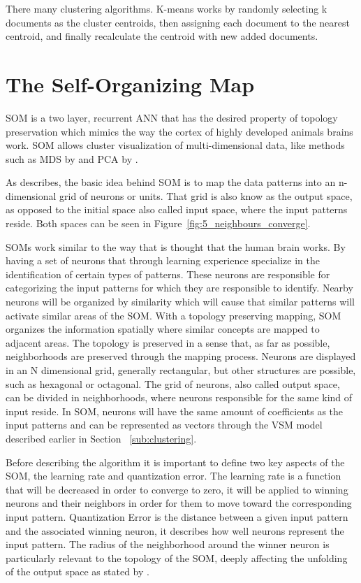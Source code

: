 There many clustering algorithms. K-means works by randomly selecting k documents as the cluster centroids, then assigning each document to the nearest centroid, and finally recalculate the centroid with new added documents. 

\section{The Self-Organizing Map} 
\label{sec:the_self_organizing_map}

\ac{SOM} is a two layer, recurrent \ac{ANN} that has the desired property of topology preservation which mimics the way the cortex of highly developed animals brains work. \ac{SOM} allows cluster visualization of multi-dimensional data, like methods such as \ac{MDS} by \citet{KruskalWish1978} and \ac{PCA} by \citet[]{Hotelling_1933} .  

As \citet{Bacao2005} describes, the basic idea behind SOM is to map the data patterns into an n-dimensional grid of neurons or units. That grid is also know as the output space, as opposed to the initial space also called input space, where the input patterns reside. Both spaces can be seen in Figure~\ref{fig:5_neighbours_converge}.

SOMs work similar to the way that is thought that the human brain works. By having a set of neurons that through learning experience specialize in the identification of certain types of patterns. These neurons are responsible for categorizing the input patterns for which they are responsible to identify. Nearby neurons will be organized by similarity which will cause that similar patterns will activate similar areas of the SOM.
With a topology preserving mapping, SOM organizes the information spatially where similar concepts are mapped to adjacent areas. The topology is preserved in a sense that, as far as possible, neighborhoods are preserved through the mapping process.
Neurons are displayed in an N dimensional grid, generally rectangular, but other structures are possible, such as hexagonal or octagonal.  The grid of neurons, also called output space, can be divided in neighborhoods, where neurons responsible for the same kind of input reside.
In SOM, neurons will have the same amount of coefficients as the input patterns and can be represented as vectors through the VSM model described earlier in Section ~\ref{sub:clustering}.

Before describing the algorithm it is important to define two key aspects of the SOM, the learning rate and quantization error. The learning rate is a function that will be decreased in order to converge to zero, it will be applied to winning neurons and their neighbors in order for them to move toward the corresponding input pattern. Quantization Error is the distance between a given input pattern and the associated winning neuron, it describes how well neurons represent the input pattern. The radius of the neighborhood around the winner neuron is particularly relevant to the topology of the SOM, deeply affecting the unfolding of the output space as stated by \citep{Bacao2005}.
\par

